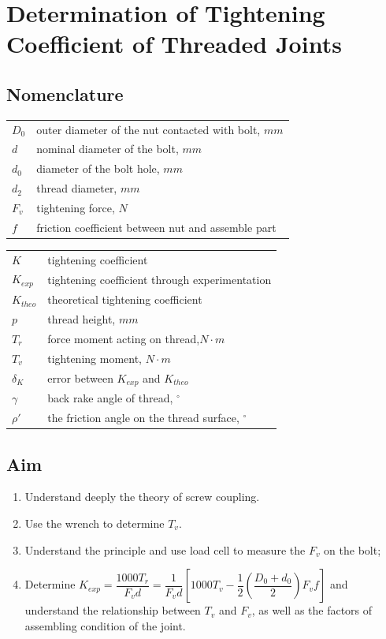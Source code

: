 \chapter{Determination of Tightening Coefficient of Threaded Joints}

\section{Nomenclature}
\begin{tabular}[t]{lp{6.5cm}}
	$ D_0 $ & outer diameter of the nut contacted with bolt, $ \unit{mm} $\\
	$ d  $ & nominal diameter of the bolt, $ \unit{mm} $\\
	$ d_0 $ & diameter of the bolt hole, $ \unit{mm} $\\
	$ d_2 $ & thread diameter, $ \unit{mm} $\\
	$ F_v $ & tightening force, $ \unit{N} $\\
	$ f $ & friction coefficient between nut and assemble part\\
\end{tabular}
\begin{tabular}[t]{lp{6.5cm}}
	$ K $ & tightening coefficient\\
	$ K_{exp} $ & tightening coefficient through experimentation\\
	$ K_{theo} $ & theoretical tightening coefficient\\
	$ p $ & thread height, $ \unit{mm} $\\
	$ T_r $ & force moment acting on thread,$ \unit{N\cdot m} $\\
	$ T_v $ & tightening moment, $ \unit{N\cdot m} $\\
	$ \delta_K $ & error between $ K_{exp} $ and $ K_{theo} $\\
	$ \gamma $ & back rake angle of thread, $ ^\circ $\\
	$ \rho' $ & the friction angle on the thread surface, $ ^\circ $
\end{tabular}

\section{Aim}
\begin{enumerate}
	\item Understand deeply the theory of screw coupling.
	\item Use the wrench to determine $ T_v $.
	\item Understand the principle and use load cell to measure the $ F_v $ on the	bolt;
	\item Determine $ K_{exp} = \dfrac{1000T_r}{F_vd} = \dfrac{1}{F_vd}\left[1000T_v-\dfrac{1}{2}\left(\dfrac{D_0+d_0}{2}\right)F_vf\right]$ and understand the relationship between $ T_v $ and $ F_v $, as well as the factors of assembling condition of the joint.
\end{enumerate}

